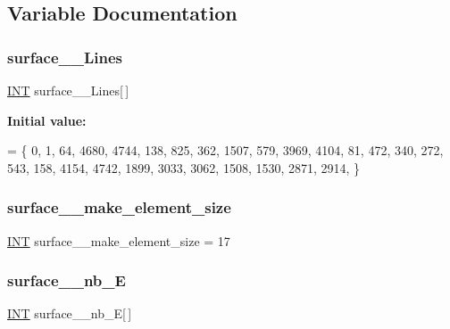 \subsection{Variable Documentation}
\mbox{\label{surface__8_8_c_ab31e94a76cae99a51f99875f41450298}} 
\subsubsection{\texorpdfstring{surface\+\_\+\_\+\+Lines}{surface\_8\_Lines}}
{\footnotesize\ttfamily \mbox{\hyperlink{galois_8h_a09fddde158a3a20bd2dcadb609de11dc}{I\+NT}} surface\+\_\+\_\+\+Lines\mbox{[}$\,$\mbox{]}}

{\bfseries Initial value\+:}
\begin{DoxyCode}
= \{ 
    0, 1, 64, 4680, 4744, 138, 825, 362, 1507, 579, 3969, 4104, 81, 472, 340, 272, 543, 158, 4154, 4742, 
      1899, 3033, 3062, 1508, 1530, 2871, 2914, 
\}
\end{DoxyCode}
\mbox{\label{surface__8_8_c_abc9abb03f45cb297bdddecdfa6a304a7}} 
\subsubsection{\texorpdfstring{surface\+\_\+\_\+make\+\_\+element\+\_\+size}{surface\_8\_make\_element\_size}}
{\footnotesize\ttfamily \mbox{\hyperlink{galois_8h_a09fddde158a3a20bd2dcadb609de11dc}{I\+NT}} surface\+\_\+\_\+make\+\_\+element\+\_\+size = 17}

\mbox{\label{surface__8_8_c_aeff7c70ba961db58d55a34947d28d56f}} 
\subsubsection{\texorpdfstring{surface\+\_\+\_\+nb\+\_\+E}{surface\_8\_nb\_E}}
{\footnotesize\ttfamily \mbox{\hyperlink{galois_8h_a09fddde158a3a20bd2dcadb609de11dc}{I\+NT}} surface\+\_\+\_\+nb\+\_\+E\mbox{[}$\,$\mbox{]}}

